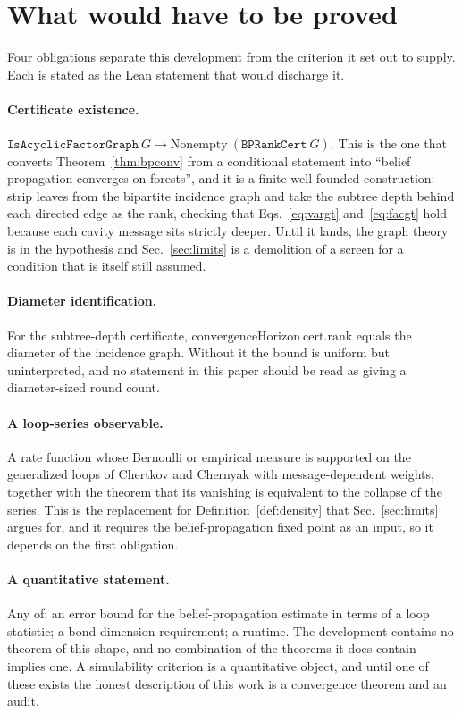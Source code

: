 \documentclass[aps,prx,reprint,nofootinbib,floatfix]{revtex4-2}
\begin{document}
\section{What would have to be proved}
\label{sec:outlook}

Four obligations separate this development from the criterion it set out to
supply. Each is stated as the Lean statement that would discharge it.

\paragraph{Certificate existence.}
$\texttt{IsAcyclicFactorGraph}\ G \to \mathrm{Nonempty}\ (\texttt{BPRankCert}\ G)$.
This is the one that converts Theorem~\ref{thm:bpconv} from a conditional
statement into ``belief propagation converges on forests'', and it is a finite
well-founded construction: strip leaves from the bipartite incidence graph and
take the subtree depth behind each directed edge as the rank, checking that
Eqs.~\eqref{eq:vargt} and~\eqref{eq:facgt} hold because each cavity message sits
strictly deeper. Until it lands, the graph theory is in the hypothesis and
Sec.~\ref{sec:limits} is a demolition of a screen for a condition that is
itself still assumed.

\paragraph{Diameter identification.}
For the subtree-depth certificate, $\mathrm{convergenceHorizon}\ \mathrm{cert.rank}$
equals the diameter of the incidence graph. Without it the bound is uniform but
uninterpreted, and no statement in this paper should be read as giving a
diameter-sized round count.

\paragraph{A loop-series observable.}
A rate function whose Bernoulli or empirical measure is supported on the
generalized loops of Chertkov and Chernyak with message-dependent weights,
together with the theorem that its vanishing is equivalent to the collapse of
the series. This is the replacement for
Definition~\ref{def:density} that Sec.~\ref{sec:limits} argues for, and it
requires the belief-propagation fixed point as an input, so it depends on the
first obligation.

\paragraph{A quantitative statement.}
Any of: an error bound for the belief-propagation estimate in terms of a loop
statistic; a bond-dimension requirement; a runtime. The development contains no
theorem of this shape, and no combination of the theorems it does contain
implies one. A simulability criterion is a quantitative object, and until one
of these exists the honest description of this work is a convergence theorem
and an audit.
\end{document}
